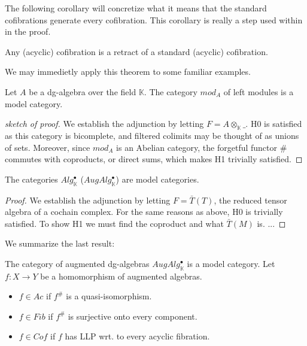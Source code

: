\documentclass[../thesis.tex]{subfiles}
\begin{document}
            The following corollary will concretize what it means that the standard cofibrations generate every cofibration. This corollary is really a step used within in the proof.

            \begin{corollary}
                Any (acyclic) cofibration is a retract of a standard (acyclic) cofibration.
            \end{corollary}

            We may immedietly apply this theorem to some familiar examples.

            \begin{corollary}
                Let $A$ be a dg-algebra over the field $\mathbb{K}$. The category $mod_A$ of left modules is a model category.
            \end{corollary}

            \begin{proof}[sketch of proof]
                We establish the adjunction by letting $F = A\otimes_\mathbb{K}\_$. H0 is satisfied as this category is bicomplete, and filtered colimits may be thought of as unions of sets. Moreover, since $mod_A$ is an Abelian category, the forgetful functor $\#$ commutes with coproducts, or direct sums, which makes H1 trivially satisfied.
            \end{proof}

            \begin{corollary}
                The categories $Alg^\bullet_\mathbb{K}$ ($AugAlg^\bullet_\mathbb{K}$) are model categories.
            \end{corollary}

            \begin{proof}
                We establish the adjunction by letting $F = \bar{T} (T)$, the reduced tensor algebra of a cochain complex. For the same reasons as above, H0 is trivially satisfied. To show H1 we must find the coproduct and what $\bar{T}(M)$ is. ...
            \end{proof}

            We summarize the last result:

            The category of augmented dg-algebras $AugAlg^\bullet_\mathbb{K}$ is a model category. Let $f:X\rightarrow Y$ be a homomorphism of augmented algebras. 
            \begin{itemize}
                \item $f\in Ac$ if $f^\#$ is a quasi-isomorphism.
                \item $f\in Fib$ if $f^\#$ is surjective onto every component.
                \item $f\in Cof$ if $f$ has LLP wrt. to every acyclic fibration.
            \end{itemize}
            
\end{document}
